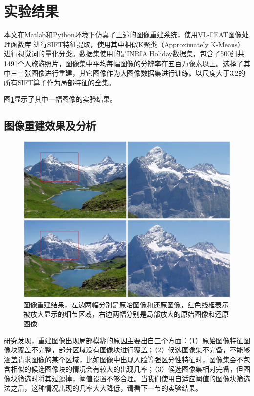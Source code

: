 \section{实验结果}
本文在Matlab和Python环境下仿真了上述的图像重建系统，使用VL-FEAT图像处理函数库
\cite{vl_feat}进行SIFT特征提取，使用其中相似K聚类（Approximately K-Means）进行视觉词的量化分类。数据集使用的是INRIA Holiday数据集\cite{INRIA}，包含了500组共1491个人旅游照片，图像集中平均每幅图像的分辨率在五百万像素以上。选择了其中三十张图像进行重建，其它图像作为大图像数据集进行训练。以尺度大于3.2的所有SIFT算子作为局部特征的全集。

图\ref{fig:detail_result}显示了其中一幅图像的实验结果。

\subsection{图像重建效果及分析}
\begin{figure}
\centering\includegraphics[width=15cm]{imgs/ch4/detail_result}
\caption{图像重建结果，左边两幅分别是原始图像和还原图像，红色线框表示被放大显示的细节区域，右边两幅分别是局部放大的原始图像和还原图像}
\label{fig:detail_result}
\end{figure}

研究发现，重建图像出现局部模糊的原因主要出自三个方面：（1）原始图像特征图像块覆盖不完整，部分区域没有图像块进行覆盖；（2）候选图像集不完备，不能够涵盖请求图像的某个区域，比如图像中出现人脸等强区分性特征时，图像集会不包含相似的候选图像块的情况会有较大的出现几率；（3）候选图像集相对完备，但图像块筛选时将其过滤掉，阈值设置不够合理。当我们使用自适应阈值的图像块筛选法之后，这种情况出现的几率大大降低，请看下一节的实验结果。

